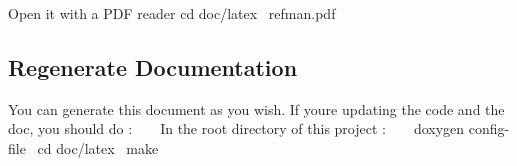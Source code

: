 Open it with a P\+DF reader {\ttfamily cd doc/latex}~\newline
 {\ttfamily refman.\+pdf}

\subsection*{Regenerate Documentation}

You can generate this document as you wish. If you\textquotesingle{}re updating the code and the doc, you should do \+: ~\newline
~\newline
 In the root directory of this project \+: ~\newline
~\newline
 {\ttfamily doxygen config-\/file}~\newline
 {\ttfamily cd doc/latex}~\newline
 {\ttfamily make}~\newline
 